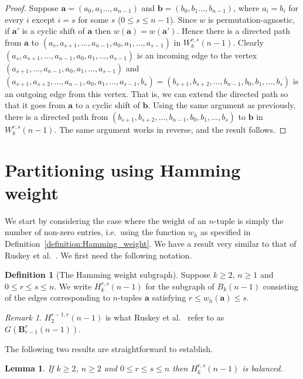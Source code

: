 \documentclass[a4paper,11pt]{article}
\theoremstyle{plain}
\newtheorem{lemma}{Lemma}[section]
\theoremstyle{definition}
\newtheorem{definition}{Definition}[section]
\theoremstyle{remark}
\newtheorem{remark}{Remark}[section]
\begin{document}
\begin{proof}
Suppose $\mathbf{a}=(a_0,a_1\dots,a_{n-1})$ and $\mathbf{b}=(b_0,b_1\dots,b_{n-1})$, where
$a_i=b_i$ for every $i$ except $i=s$ for some $s$ ($0\leq s\leq n-1$).  Since $w$ is
permutation-agnostic, if $\mathbf{a}'$ is a cyclic shift of $\mathbf{a}$ then
$w(\mathbf{a})=w(\mathbf{a}')$.  Hence there is a directed path from $\mathbf{a}$ to
$(a_s,a_{s+1},\dots,a_{n-1},a_0,a_1,\dots,a_{s-1})$ in $W_k^{r,s}(n-1)$. Clearly
$(a_s,a_{s+1},\dots,a_{n-1},a_0,a_1,\dots,a_{s-1})$ is an incoming edge to the vertex
$(a_{s+1},\dots,a_{n-1},a_0,a_1,\dots,a_{s-1})$ and
$(a_{s+1},a_{s+2},\dots,a_{n-1},a_0,a_1,\dots,a_{s-1},b_s)=(b_{s+1},b_{s+2},\dots,b_{n-1},b_0,b_1,\dots,b_s)$
is an outgoing edge from this vertex.  That is, we can extend the directed path so that it goes
from $\mathbf{a}$ to a cyclic shift of $\mathbf{b}$. Using the same argument as previously,
there is a directed path from $(b_{s+1},b_{s+2},\dots,b_{n-1},b_0,b_1,\dots,b_s)$ to
$\mathbf{b}$ in $W_k^{r,s}(n-1)$. The same argument works in reverse, and the result follows.
\end{proof}

\section{Partitioning using Hamming weight}

We start by considering the case where the weight of an $n$-tuple is simply the number of non-zero
entries, i.e.\ using the function $w_h$ as specified in Definition~\ref{definition:Hamming_weight}.
We have a result very similar to that of Ruskey et al.\ \cite{Ruskey12}.  We first need the
following notation.

\begin{definition}[The Hamming weight subgraph]
Suppose $k\geq2$, $n\geq 1$ and $0\leq r\leq s\leq n$. We write $H_k^{r,s}(n-1)$ for the subgraph
of $B_k(n-1)$ consisting of the edges corresponding to $n$-tuples $\mathbf{a}$ satisfying $r\leq
w_h(\mathbf{a})\leq s$.
\end{definition}

\begin{remark}
$H_2^{r-1,r}(n-1)$ is what Ruskey et al.\ \cite{Ruskey12} refer to as $G(\mathbf{B}_{r-1}^r(n-1))$.
\end{remark}

The following two results are straightforward to establish.

\begin{lemma}  \label{lemma:H_balanced}
If $k\geq2$, $n\geq 2$ and $0\leq r\leq s\leq n$ then $H_k^{r,s}(n-1)$ is balanced.
\end{lemma}
\end{document}
